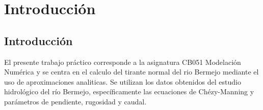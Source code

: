 \section{Introducción}
    \subsection{Introducción}
    
    El presente trabajo práctico corresponde a la asignatura CB051 Modelación Numérica y se centra en el calculo del tirante normal del rio Bermejo mediante el uso de aproximaciones analiticas. Se utilizan los datos obtenidos del estudio hidrológico del río Bermejo, específicamente las ecuaciones de Chézy-Manning y parámetros de pendiente, rugosidad y caudal.
